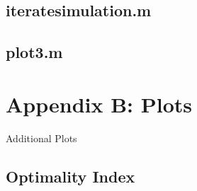 \documentclass[11pt]{article}
\begin{document}
\subsection*{iteratesimulation.m}

\subsection*{plot3.m}


\newpage
\section{Appendix B: Plots}

Additional Plots

\subsection{Optimality Index} \label{addplotopt}
\end{document}
